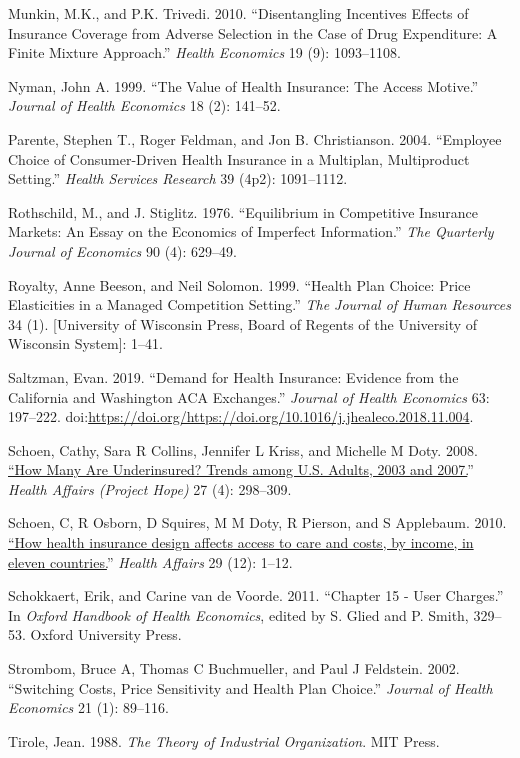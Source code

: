 \documentclass[a4paper,12pt]{article}
\begin{document}
\hypertarget{citeproc_bib_item_31}{Munkin, M.K., and P.K. Trivedi. 2010. “Disentangling Incentives Effects of Insurance Coverage from Adverse Selection in the Case of Drug Expenditure: A Finite Mixture Approach.” \textit{Health Economics} 19 (9): 1093–1108.}

\hypertarget{citeproc_bib_item_32}{Nyman, John A. 1999. “The Value of Health Insurance: The Access Motive.” \textit{Journal of Health Economics} 18 (2): 141–52.}

\hypertarget{citeproc_bib_item_33}{Parente, Stephen T., Roger Feldman, and Jon B. Christianson. 2004. “Employee Choice of Consumer-Driven Health Insurance in a Multiplan, Multiproduct Setting.” \textit{Health Services Research} 39 (4p2): 1091–1112.}

\hypertarget{citeproc_bib_item_34}{Rothschild, M., and J. Stiglitz. 1976. “Equilibrium in Competitive Insurance Markets: An Essay on the Economics of Imperfect Information.” \textit{The Quarterly Journal of Economics} 90 (4): 629–49.}

\hypertarget{citeproc_bib_item_35}{Royalty, Anne Beeson, and Neil Solomon. 1999. “Health Plan Choice: Price Elasticities in a Managed Competition Setting.” \textit{The Journal of Human Resources} 34 (1). [University of Wisconsin Press, Board of Regents of the University of Wisconsin System]: 1–41.}

\hypertarget{citeproc_bib_item_36}{Saltzman, Evan. 2019. “Demand for Health Insurance: Evidence from the California and Washington ACA Exchanges.” \textit{Journal of Health Economics} 63: 197–222. doi:\url{https://doi.org/https://doi.org/10.1016/j.jhealeco.2018.11.004}.}

\hypertarget{citeproc_bib_item_37}{Schoen, Cathy, Sara R Collins, Jennifer L Kriss, and Michelle M Doty. 2008. \href{https://www.ncbi.nlm.nih.gov/pubmed/18544591}{“How Many Are Underinsured? Trends among U.S. Adults, 2003 and 2007.}” \textit{Health Affairs (Project Hope)} 27 (4): 298–309.}

\hypertarget{citeproc_bib_item_38}{Schoen, C, R Osborn, D Squires, M M Doty, R Pierson, and S Applebaum. 2010. \href{https://www.ncbi.nlm.nih.gov/pubmed/21088012}{“How health insurance design affects access to care and costs, by income, in eleven countries.}” \textit{Health Affairs} 29 (12): 1–12.}

\hypertarget{citeproc_bib_item_39}{Schokkaert, Erik, and Carine van de Voorde. 2011. “Chapter 15 - User Charges.” In \textit{Oxford Handbook of Health Economics}, edited by S. Glied and P. Smith, 329–53. Oxford University Press.}

\hypertarget{citeproc_bib_item_40}{Strombom, Bruce A, Thomas C Buchmueller, and Paul J Feldstein. 2002. “Switching Costs, Price Sensitivity and Health Plan Choice.” \textit{Journal of Health Economics} 21 (1): 89–116.}

\hypertarget{citeproc_bib_item_41}{Tirole, Jean. 1988. \textit{The Theory of Industrial Organization}. MIT Press.}\bigskip
\end{document}
